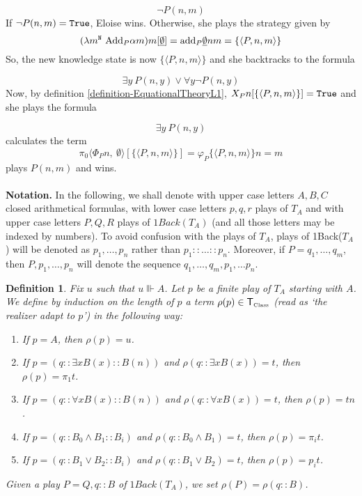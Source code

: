 \documentclass[copyright,creativecommons]{eptcs}
\newcommand{\Nat}                      { {\tt N} }
\newcommand{\SystemT}                  {\mathsf{T}}
\newcommand{\True}                     { {\tt{True}} }
\newcommand{\Class}                    {\mbox{\tiny Class}}
\newcommand{\SystemTClass}             {{\SystemT_{\Class}}}
\newcommand{\proj}                     { {p} }
\newcommand{\Add}                      { {\mbox{Add}} }
\newcommand{\add}                      { {\mbox{add}} }
\newcommand{\makestate}      [1]       { {\underline{#1}} }
\newtheorem{definition}{Definition}
\begin{document}
\[\neg P(n,m)\]
If $\neg P(n,m)=\True$, Eloise wins. Otherwise, she plays the strategy given by 
\[ (\lambda m^{\Nat}\ \Add_P {\alpha}m )m[\makestate{\emptyset}]= \add_P \makestate{\emptyset} n m=\{\langle P,n,m\rangle\}\]
So, the new knowledge state is now $\{\langle P,n,m\rangle\}$ and she backtracks to the formula

\[\exists y\ P(n, y)\vee \forall y \neg P(n,y)\]
Now, by definition \ref{definition-EquationalTheoryL1}, $X_Pn[\{\langle P,n,m\rangle\}]=\True$ and she plays the formula

\[\exists y\ P(n, y)\]
calculates the term \[\pi_0\langle
\Phi_Pn,\
{\emptyset} \rangle[\{\langle P,n,m\rangle\}]=\varphi_P\{\langle P,n,m\rangle\}n=m\]
plays $P(n,m)$ and wins.\\\\
\textbf{Notation.} In the following, we shall denote with upper case letters $A, B,C$
closed arithmetical formulas, with lower case letters $p,q,r$
plays of $T_A$ and with upper case letters $P,Q,R$  plays of
$1Back(T_A)$ (and all those letters may be indexed by numbers). To avoid confusion with the plays of $T_A$, plays of 1Back($T_A$) will be denoted as $p_1,\ldots, p_n$ rather than $p_1::\ldots :: p_n$. Moreover, if $P=q_1,\ldots, q_m$, then $P, p_1,\ldots, p_n$ will denote the sequence $q_1, \ldots, q_m, p_1,\ldots p_n $.

 \begin{definition}\label{adaptrealizer}
 Fix $u$ such that $u\Vvdash A$. Let  $p$ be a finite play of
$T_A$ starting with $A$. We define by induction on the length of
$p$ a term $\rho(p)\in \SystemTClass$ (read as `the realizer adapt
to $p$')  in the following way: \begin{enumerate} 
\item If $p=A$, then
$\rho(p)=u$. \item If $p=(q:: \exists x B(x):: B(n))$ and
$\rho(q:: \exists x B(x))=t$, then $\rho(p)=\pi_1t$. 
\item If $p=(q::
\forall x B(x):: B(n))$ and $\rho(q:: \forall x B(x))=t$,
then $\rho(p)=tn$. 
\item  If $p=(q::  B_0\land B_1:: B_i)$
and $\rho(q:: B_0\land  B_1)=t$, then $\rho(p)=\pi_it$. 
\item If
$p=(q::  B_1\lor B_2:: B_i)$ and $\rho(q:: B_1\lor  B_2)=t$, then
$\rho(p)=\proj_it$.\end{enumerate}
 Given a play $P=Q, q::B$ of $1Back(T_A)$, we set
$\rho(P)=\rho(q::B)$.

\end{definition}
\end{document}

